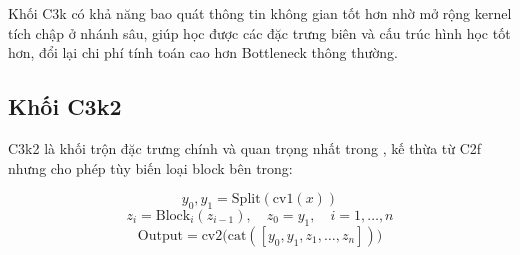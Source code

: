 Khối C3k có khả năng bao quát thông tin không gian tốt hơn nhờ mở rộng kernel tích chập ở nhánh sâu, giúp học được các đặc trưng biên và cấu trúc hình học tốt hơn, đổi lại chi phí tính toán cao hơn Bottleneck thông thường.

\subsection{Khối C3k2}
\label{subsec:c3k2}

C3k2 là khối trộn đặc trưng chính và quan trọng nhất trong \yolo, kế thừa từ C2f nhưng cho phép tùy biến loại block bên trong:

\begin{equation}
    y_0, y_1 = \text{Split}(\text{cv1}(x))
    \label{eq:c3k2_split}
\end{equation}
\begin{equation}
    z_i = \text{Block}_i(z_{i-1}), \quad z_0 = y_1, \quad i = 1, \ldots, n
    \label{eq:c3k2_blocks}
\end{equation}
\begin{equation}
    \text{Output} = \text{cv2}\big(\text{cat}([y_0, y_1, z_1, \ldots, z_n])\big)
    \label{eq:c3k2_output}
\end{equation}

